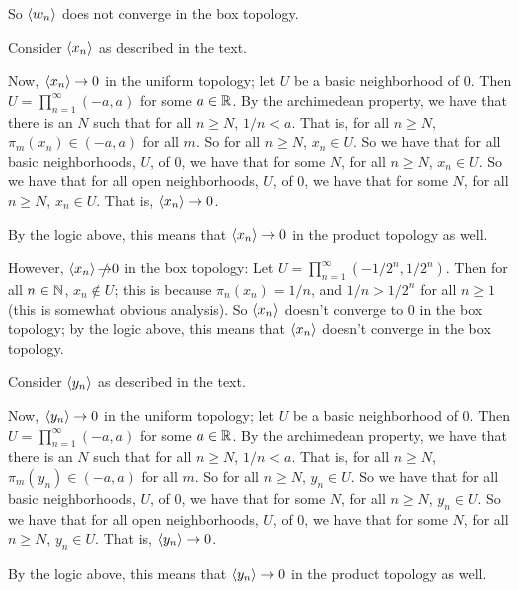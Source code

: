 \documentclass[a4paper,12pt]{article}
\begin{document}
So $\left\langle w_n \right\rangle$ does not converge in the box topology.

Consider $\left\langle x_n \right\rangle$ as described in the text. 

Now, $\left\langle x_n \right\rangle \to 0$ in the uniform topology; let $U$ be a basic neighborhood of $0$. Then $U= \prod\limits_{n=1}^\infty (-a,a)$ for some $a \in \mathbb{R}$. By the archimedean property, we have that there is an $N$ such that for all $n \geq N$, $1/n < a$. That is, for all $n \geq N$, $\pi_m(x_n) \in (-a,a)$ for all $m$. So for all $n \geq N$, $x_n \in U$. So we have that for all basic neighborhoods, $U$, of $0$, we have that for some $N$, for all $n \geq N$, $x_n \in U$. So we have that for all open neighborhoods, $U$, of $0$, we have that for some $N$, for all $n \geq N$, $x_n \in U$.  That is, $\left\langle x_n \right\rangle \to 0$.

By the logic above, this means that $\left\langle x_n \right\rangle \to 0$ in the product topology as well.

However, $\left\langle x_n \right\rangle \slashed{\to} 0$ in the box topology: Let $U = \prod\limits_{n=1}^\infty (-1/2^n,1/2^n)$. Then for all $n \in \mathbb{N}$, $x_n \notin U$; this is because $\pi_n(x_n) = 1/n$, and $1/n > 1/2^n$ for all $n \geq 1$ (this is somewhat obvious analysis). So $\left\langle x_n \right\rangle$ doesn't converge to $0$ in the box topology; by the logic above, this means that $\left\langle x_n \right\rangle$ doesn't converge in the box topology.


Consider $\left\langle y_n \right\rangle$ as described in the text. 

Now, $\left\langle y_n \right\rangle \to 0$ in the uniform topology; let $U$ be a basic neighborhood of $0$. Then $U= \prod\limits_{n=1}^\infty (-a,a)$ for some $a \in \mathbb{R}$. By the archimedean property, we have that there is an $N$ such that for all $n \geq N$, $1/n < a$. That is, for all $n \geq N$, $\pi_m(y_n) \in (-a,a)$ for all $m$. So for all $n \geq N$, $y_n \in U$. So we have that for all basic neighborhoods, $U$, of $0$, we have that for some $N$, for all $n \geq N$, $y_n \in U$. So we have that for all open neighborhoods, $U$, of $0$, we have that for some $N$, for all $n \geq N$, $y_n \in U$.  That is, $\left\langle y_n \right\rangle \to 0$.

By the logic above, this means that $\left\langle y_n \right\rangle \to 0$ in the product topology as well.
\end{document}

